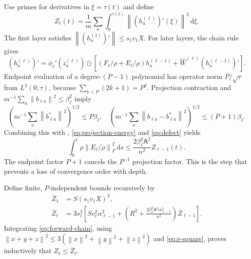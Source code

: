 \documentclass[11pt]{article}
\theoremstyle{definition}
\theoremstyle{remark}
\newcommand{\norm}[1]{\left\lVert #1\right\rVert}
\newcommand{\od}{\mathbin{\odot}}
\newcommand{\dd}{\,\mathrm{d}}
\begin{document}
Use primes for derivatives in $\xi=\tau(t)$ and define
\[
 Z_\ell(t)=\frac1m\sum_a\int_0^{\tau(t)}
 \norm{(h_a^{(\ell)})'(\xi)}^2\dd\xi.
\]
The first layer satisfies
$\norm{(h_a^{(1)})'}\le s_1v_1X$.  For later layers, the chain rule gives
\[
 (h_a^{(\ell)})'=\phi_\ell'(z_a^{(\ell)})\od
 \left[(F_\ell/\rho+E_\ell/\rho)h_a^{(\ell-1)}
 +\widehat W^{(\ell)}(h_a^{(\ell-1)})'\right].       \label{eq:forward-chain}
\]
Endpoint evaluation of a degree-$(P-1)$ polynomial has operator norm
$P/\sqrt\tau$ from $L^2(0,\tau)$, because
$\sum_{k<P}(2k+1)=P^2$.  Projection contraction and
$m^{-1}\sum_a\norm{b_{\ell a}}^2\le\beta_\ell^2$ imply
\[
 \left(m^{-1}\sum_a\norm{b_{\ell a}^*}^2\right)^{1/2}\le P\beta_\ell,
 \quad
 \left(m^{-1}\sum_a\norm{b_{\ell a}-b_{\ell a}^*}^2\right)^{1/2}
 \le(P+1)\beta_\ell.
\]
Combining this with ,
\eqref{eq:projection-energy} and \eqref{eq:defect} yields
\begin{equation}
 \int_0^t\rho\norm{E_\ell/\rho}_F^2\dd s
 \le\frac{2\beta_\ell^2\mathsf A^2}{n^2}
 Z_{\ell-1}(t).                                      \label{eq:e-square}
\end{equation}
The endpoint factor $P+1$ cancels the $P^{-1}$ projection factor.  This is
the step that prevents a loss of convergence order with depth.

Define finite, $P$-independent bounds recursively by
\begin{align}
 \overline Z_1&=S(s_1v_1X)^2,\nonumber\\
 \overline Z_\ell&=3s_\ell^2\left[
 S v_\ell^2\alpha_{\ell-1}^2+
 \left(R^2+\frac{2\beta_\ell^2\mathsf A^2\alpha_{\ell-1}^2}{n^2}\right)
 \overline Z_{\ell-1}\right].                       \label{eq:z-recursion}
\end{align}
Integrating \eqref{eq:forward-chain}, using
$\norm{x+y+z}^2\le3(\norm{x}^2+\norm{y}^2+\norm{z}^2)$ and
\eqref{eq:e-square}, proves inductively that $Z_\ell\le\overline Z_\ell$.
\end{document}
